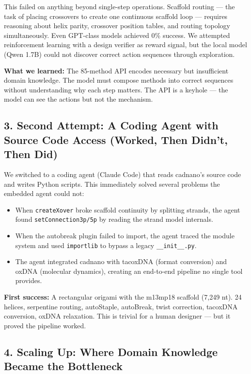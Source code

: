 \documentclass[
  11pt,
]{article}
\providecommand{\tightlist}{%
  \setlength{\itemsep}{0pt}\setlength{\parskip}{0pt}}
\begin{document}
This failed on anything beyond single-step operations. Scaffold routing
--- the task of placing crossovers to create one continuous scaffold
loop --- requires reasoning about helix parity, crossover position
tables, and routing topology simultaneously. Even GPT-class models
achieved 0\% success. We attempted reinforcement learning with a design
verifier as reward signal, but the local model (Qwen 1.7B) could not
discover correct action sequences through exploration.

\textbf{What we learned:} The 85-method API encodes necessary but
insufficient domain knowledge. The model must compose methods into
correct sequences without understanding why each step matters. The API
is a keyhole --- the model can see the actions but not the mechanism.

\subsection{3. Second Attempt: A Coding Agent with Source Code Access
(Worked, Then Didn't, Then
Did)}\label{second-attempt-a-coding-agent-with-source-code-access-worked-then-didnt-then-did}

We switched to a coding agent (Claude Code) that reads cadnano's source
code and writes Python scripts. This immediately solved several problems
the embedded agent could not:

\begin{itemize}
\tightlist
\item
  When \texttt{createXover} broke scaffold continuity by splitting
  strands, the agent found \texttt{setConnection3p/5p} by reading the
  strand model internals.
\item
  When the autobreak plugin failed to import, the agent traced the
  module system and used \texttt{importlib} to bypass a legacy
  \texttt{\_\_init\_\_.py}.
\item
  The agent integrated cadnano with tacoxDNA (format conversion) and
  oxDNA (molecular dynamics), creating an end-to-end pipeline no single
  tool provides.
\end{itemize}

\textbf{First success:} A rectangular origami with the m13mp18 scaffold
(7,249 nt). 24 helices, serpentine routing, autoStaple, autoBreak, twist
correction, tacoxDNA conversion, oxDNA relaxation. This is trivial for a
human designer --- but it proved the pipeline worked.

\subsection{4. Scaling Up: Where Domain Knowledge Became the
Bottleneck}\label{scaling-up-where-domain-knowledge-became-the-bottleneck}
\end{document}
